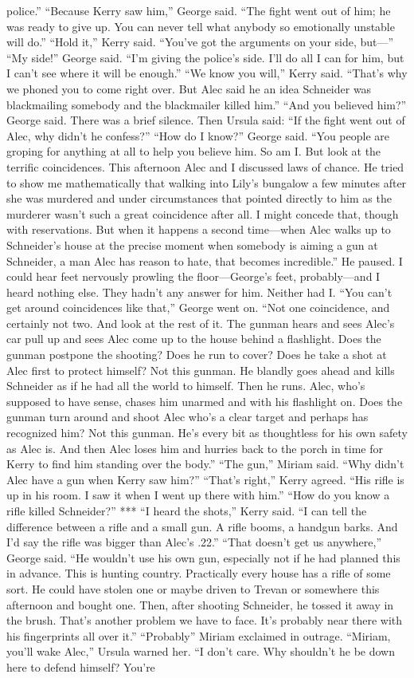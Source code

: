 \documentclass{novel}
\begin{document}
police.” “Because Kerry saw him,” George said. “The fight went out of him; he was ready to give up. You can never tell what anybody so emotionally unstable will do.” “Hold it,” Kerry said. “You’ve got the arguments on your side, but—” “My side!” George said. “I’m giving the police’s side. I’ll do all I can for him, but I can’t see where it will be enough.” “We know you will,” Kerry said. “That’s why we phoned you to come right over. But Alec said he an idea Schneider was blackmailing somebody and the blackmailer killed him.” “And you believed him?” George said. There was a brief silence. Then Ursula said: “If the fight went out of Alec, why didn’t he confess?” “How do I know?” George said. “You people are groping for anything at all to help you believe him. So am I. But look at the terrific coincidences. This afternoon Alec and I discussed laws of chance. He tried to show me mathematically that walking into Lily’s bungalow a few minutes after she was murdered and under circumstances that pointed directly to him as the murderer wasn’t such a great coincidence after all. I might concede that, though with reservations. But when it happens a second time—when Alec walks up to Schneider’s house at the precise moment when somebody is aiming a gun at Schneider, a man Alec has reason to hate, that becomes incredible.” He paused. I could hear feet nervously prowling the floor—George’s feet, probably—and I heard nothing else. They hadn’t any answer for him. Neither had I. “You can’t get around coincidences like that,” George went on. “Not one coincidence, and certainly not two. And look at the rest of it. The gunman hears and sees Alec’s car pull up and sees Alec come up to the house behind a flashlight. Does the gunman postpone the shooting? Does he run to cover? Does he take a shot at Alec first to protect himself? Not this gunman. He blandly goes ahead and kills Schneider as if he had all the world to himself. Then he runs. Alec, who’s supposed to have sense, chases him unarmed and with his flashlight on. Does the gunman turn around and shoot Alec who’s a clear target and perhaps has recognized him? Not this gunman. He’s every bit as thoughtless for his own safety as Alec is. And then Alec loses him and hurries back to the porch in time for Kerry to find him standing over the body.” “The gun,” Miriam said. “Why didn’t Alec have a gun when Kerry saw him?” “That’s right,” Kerry agreed. “His rifle is up in his room. I saw it when I went up there with him.” “How do you know a rifle killed Schneider?” *** “I heard the shots,” Kerry said. “I can tell the difference between a rifle and a small gun. A rifle booms, a handgun barks. And I’d say the rifle was bigger than Alec’s .22.” “That doesn’t get us anywhere,” George said. “He wouldn’t use his own gun, especially not if he had planned this in advance. This is hunting country. Practically every house has a rifle of some sort. He could have stolen one or maybe driven to Trevan or somewhere this afternoon and bought one. Then, after shooting Schneider, he tossed it away in the brush. That’s another problem we have to face. It’s probably near there with his fingerprints all over it.” “Probably” Miriam exclaimed in outrage. “Miriam, you’ll wake Alec,” Ursula warned her. “I don’t care. Why shouldn’t he be down here to defend himself? You’re 
\end{document}
